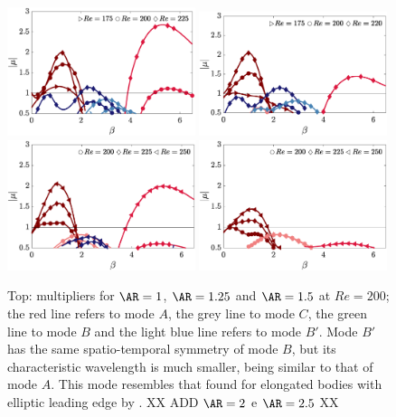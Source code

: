 \begin{figure}
  \centering
  \includegraphics[width=0.49\textwidth]{./fig/AR1/neutralb.eps}
  \includegraphics[width=0.49\textwidth]{./fig/AR1p25/neutralb.eps}  
  \includegraphics[width=0.49\textwidth]{./fig/AR1p5/neutralb.eps}    
  \includegraphics[width=0.49\textwidth]{./fig/AR1p75/neutralb.eps}       
  \caption{Top: multipliers for $\AR=1$, $\AR=1.25$ and $\AR=1.5$ at $Re=200$; the red line refers to mode $A$, the grey line to mode $C$, the green line to mode $B$ and the light blue line refers to mode $B'$. Mode $B'$ has the same spatio-temporal symmetry of mode $B$, but its characteristic wavelength is much smaller, being similar to that of mode $A$. This mode resembles that found for elongated bodies with elliptic leading edge by \cite{ryan-etal-2005}. XX ADD $\AR=2$ e $\AR=2.5$ XX}
  \label{fig:mult_AR1_AR1p75}
\end{figure}
